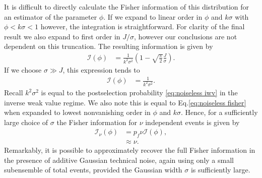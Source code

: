 It is difficult to directly calculate the Fisher information of this distribution for an estimator of the parameter $\phi$.  If we expand to linear order in $\phi$ and $k\sigma$ with $\phi < k\sigma < 1$ however, the integration is straightforward.  For clarity of the final result we also expand to first order in $J/\sigma$, however our conclusions are not dependent on this truncation.  The resulting information is given by
\begin{align}
	\mathcal{I}(\phi) &= \frac{1}{k^2\sigma^2}\left(1 - \sqrt{\frac{\pi}{2}}\frac{J}{\sigma}\right).
\end{align}
If we choose $\sigma \gg J$, this expression tends to 
\begin{align}
	\mathcal{I}(\phi) &= \frac{1}{k^2\sigma^2}.
\end{align}
Recall $k^2\sigma^2$ is equal to the postselection probability \eqref{eq:noiseless iwv} in the inverse weak value regime.  We also note this is equal to Eq.\eqref{eq:noiseless fisher} when expanded to lowest nonvanishing order in $\phi$ and $k\sigma$.  Hence, for a sufficiently large choice of $\sigma$ the Fisher information for $\nu$ independent events is given by 
\begin{align}
	\mathcal{I}_\nu(\phi) &= p_f \nu \mathcal{I}(\phi), \nonumber \\
	&\approx \nu.
\end{align}
Remarkably, it is possible to approximately recover the full Fisher information in the presence of additive Gaussian technical noise, again using only a small subensemble of total events, provided the Gaussian width $\sigma$ is sufficiently large.

